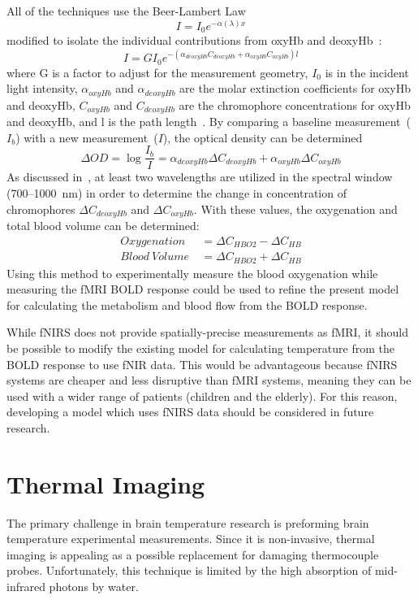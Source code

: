 All of the techniques use the Beer-Lambert Law~\citep{beerlambert}
\begin{equation}
  I = I_0 e^{-\alpha (\lambda) x} \label{eq:beerlambert1}
\end{equation} 
modified to isolate the individual contributions from oxyHb and deoxyHb~\citep{cope}:
\begin{equation}
  \label{eq:modifiedbeerlamber}
  I = G I_0 e^{-(\alpha_{deoxyHb}C_{deoxyHb}+\alpha_{oxyHb}C_{oxyHb}) l} 
\end{equation}
where G is a factor to adjust for the measurement geometry, $I_0$ is in the incident light intensity, $\alpha_{oxyHb}$ and $\alpha_{deoxyHb}$ are the molar extinction coefficients for oxyHb and deoxyHb, $C_{oxyHb}$ and $C_{deoxyHb}$ are the chromophore concentrations for oxyHb and deoxyHb, and l is the path length~\citep{izzetoglu2004}.  By comparing a baseline measurement~($I_b$) with a new measurement~($I$), the optical density can be determined~\citep{izzetoglu2004}
\begin{equation}
  \Delta OD = \log \frac{I_b}{I} = \alpha_{deoxyHb} \Delta C_{deoxyHb}+\alpha_{oxyHb} \Delta C_{oxyHb}
\end{equation}
As discussed in~\citet{izzetoglu2004}, at least two wavelengths are utilized in the spectral window (700--1000~nm) in order to determine the change in concentration of chromophores $\Delta C_{deoxyHb}$ and $\Delta C_{oxyHb}$.  With these values, the oxygenation and total blood volume can be determined:
\begin{align}
  \label{eq:o2bloodvolume}
  Oxygenation\ &= \Delta C_{HBO2} - \Delta C_{HB} \nonumber \\
  Blood\ Volume\ &= \Delta C_{HBO2} + \Delta C_{HB} 
\end{align}
Using this method to experimentally measure the blood oxygenation while measuring the fMRI BOLD response could be used to refine the present model for calculating the metabolism and blood flow from the BOLD response.

While fNIRS does not provide spatially-precise measurements as fMRI, it should be possible to modify the existing model for calculating temperature from the BOLD response to use fNIR data. This would be advantageous because fNIRS systems are cheaper and less disruptive than fMRI systems, meaning they can be used with a wider range of patients (children and the elderly).  For this reason, developing a model which uses fNIRS data should be considered in future research.

\section{Thermal Imaging}
\label{sec:ThermalImaging}
The primary challenge in brain temperature research is preforming brain temperature experimental measurements.  Since it is non-invasive, thermal imaging is appealing as a possible replacement for damaging thermocouple probes.  Unfortunately, this technique is limited by the high absorption of mid-infrared photons by water.

